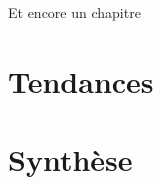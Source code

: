 \documentclass[../main.tex]{subfiles}
\begin{document}
\begin{itshape}
    Et encore un chapitre
\end{itshape}

\minitoc

\section{Tendances}

\section{Synthèse}
\end{document}
